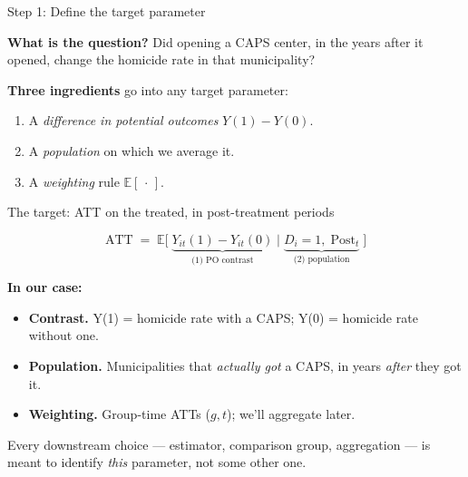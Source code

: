 \documentclass[aspectratio=169,12pt,t]{beamer}
\begin{document}
\begin{frame}{Step 1: Define the target parameter}
\vspace{0.6cm}

\textbf{What is the question?} \;Did opening a CAPS center, in the years after it opened, change the homicide rate in that municipality?

\vspace{0.5cm}

\textbf{Three ingredients} go into any target parameter:
\vspace{0.3cm}
\begin{enumerate}\setlength\itemsep{4pt}
  \item A \textit{difference in potential outcomes} \;$Y(1) - Y(0)$.
  \item A \textit{population} on which we average it.
  \item A \textit{weighting} rule \;$\mathbb{E}[\,\cdot\,]$.
\end{enumerate}

\vspace{0.5em}
\end{frame}

\begin{frame}{The target: ATT on the treated, in post-treatment periods}
\vspace{0.6cm}

\[
\text{ATT} \;=\; \mathbb{E}\Big[\;\underbrace{Y_{it}(1) - Y_{it}(0)}_{\text{(1) PO contrast}}\;\Big|\;\underbrace{D_i = 1,\;\text{Post}_t}_{\text{(2) population}}\;\Big]
\]

\vspace{0.6cm}

\textbf{In our case:}
\begin{itemize}\small
  \item \textbf{Contrast.} \;Y(1) = homicide rate with a CAPS; Y(0) = homicide rate without one.
  \item \textbf{Population.} \;Municipalities that \textit{actually got} a CAPS, in years \textit{after} they got it.
  \item \textbf{Weighting.} \;Group-time ATTs ($g,t$); we'll aggregate later.
\end{itemize}

\vspace{0.4em}
 \;Every downstream choice --- estimator, comparison group, aggregation --- is meant to identify \textit{this} parameter, not some other one.
\end{frame}
\end{document}

